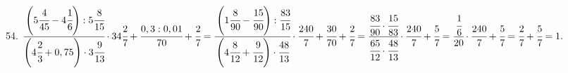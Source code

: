 54. $\cfrac{\left(5\cfrac{4}{45}-4\cfrac{1}{6}\right):5\cfrac{8}{15}}{\left(4\cfrac{2}{3}+0,75\right)\cdot3\cfrac{9}{13}}\cdot34\cfrac{2}{7}+\cfrac{0,3:0,01}{70}+\cfrac{2}{7}=
\cfrac{\left(1\cfrac{8}{90}-\cfrac{15}{90}\right):\cfrac{83}{15}}{\left(4\cfrac{8}{12}+\cfrac{9}{12}\right)\cdot\cfrac{48}{13}}\cdot\cfrac{240}{7}+\cfrac{30}{70}+\cfrac{2}{7}=
\cfrac{\cfrac{83}{90}\cdot\cfrac{15}{83}}{\cfrac{65}{12}\cdot\cfrac{48}{13}}\cdot\cfrac{240}{7}+\cfrac{5}{7}=
\cfrac{\cfrac{1}{6}}{20}\cdot\cfrac{240}{7}+\cfrac{5}{7}=\cfrac{2}{7}+\cfrac{5}{7}=1.$\\

